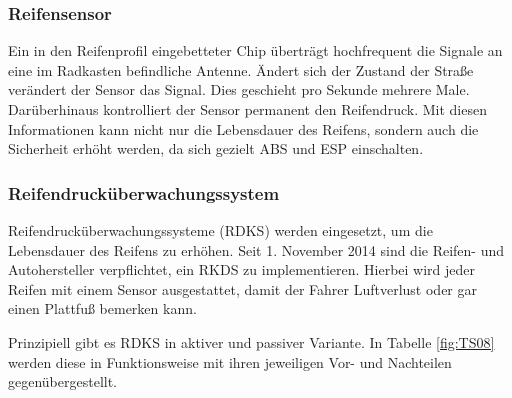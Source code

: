                 \subsubsection{Reifensensor}

                Ein in den Reifenprofil eingebetteter Chip überträgt hochfrequent die Signale an eine im Radkasten befindliche Antenne. 
                Ändert sich der Zustand der Straße verändert der Sensor das Signal. Dies geschieht pro Sekunde mehrere Male. 
                Darüberhinaus kontrolliert der Sensor permanent den Reifendruck. Mit diesen Informationen kann nicht nur die Lebensdauer des Reifens, sondern auch die Sicherheit erhöht werden, 
                da sich gezielt ABS und ESP einschalten.\\ 
			
                \subsubsection{Reifendrucküberwachungssystem}
                Reifendrucküberwachungssysteme (RDKS) werden eingesetzt, um die Lebensdauer des Reifens zu erhöhen. Seit 1. November 2014 sind die Reifen- und Autohersteller verpflichtet, ein RKDS zu implementieren.
                Hierbei wird jeder Reifen mit einem Sensor ausgestattet, damit der Fahrer Luftverlust oder gar einen Plattfuß bemerken kann.
                
                Prinzipiell gibt es RDKS in aktiver und passiver Variante. In Tabelle \ref{fig:TS08} werden diese in Funktionsweise mit ihren jeweiligen
                Vor- und Nachteilen gegenübergestellt.

